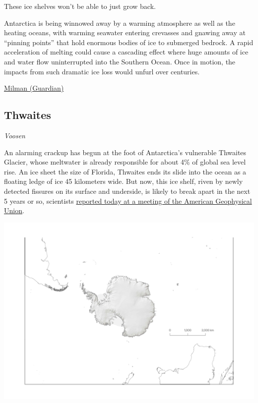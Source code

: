 \documentclass[
]{book}
\begin{document}
These ice shelves won't be able to just grow back.

Antarctica is being winnowed away by a warming atmosphere as well as the heating oceans, with warming seawater entering crevasses and gnawing away at ``pinning points'' that hold enormous bodies of ice to submerged bedrock. A rapid acceleration of melting could cause a cascading effect where huge amounts of ice and water flow uninterrupted into the Southern Ocean.
Once in motion, the impacts from such dramatic ice loss would unfurl over centuries.

\href{https://www.theguardian.com/environment/2021/may/05/antarctica-ice-sheet-melting-global-heating-sea-level-rise-study}{Milman (Guardian)}

\hypertarget{thwaites}{%
\subsection{Thwaites}\label{thwaites}}

\emph{Voosen}

An alarming crackup has begun at the foot of Antarctica's vulnerable Thwaites Glacier, whose meltwater is already responsible for about 4\% of global sea level rise. An ice sheet the size of Florida, Thwaites ends its slide into the ocean as a floating ledge of ice 45 kilometers wide. But now, this ice shelf, riven by newly detected fissures on its surface and underside, is likely to break apart in the next 5 years or so, scientists \href{https://agu.confex.com/agu/fm21/meetingapp.cgi/Paper/978762}{reported today at a meeting of the American Geophysical Union}.

\includegraphics{fig/Antarctica_Thwaites.jpeg}
\end{document}
